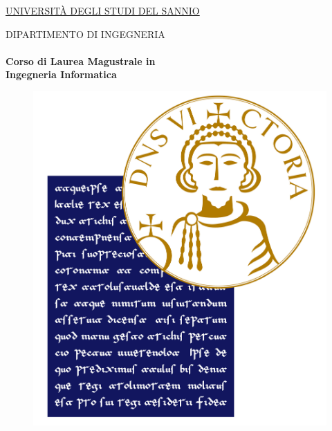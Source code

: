 \linespread{1} %

\thispagestyle{empty}
\large


\begin{center}
	\huge{{\underline{\textsc{UNIVERSIT\`A DEGLI STUDI DEL SANNIO}}}}
\end{center}

\begin{center}   
	\huge{{\textsc{DIPARTIMENTO DI INGEGNERIA}}}
	\\
	\LARGE{\textbf{\\Corso di Laurea Magustrale in \\Ingegneria Informatica}}      
	
\end{center}

\begin{figure}[h]
	\begin{center}
		\includegraphics[scale=0.3]{figure/logoUniSannio_new.jpg}
	\end{center}
\end{figure}

